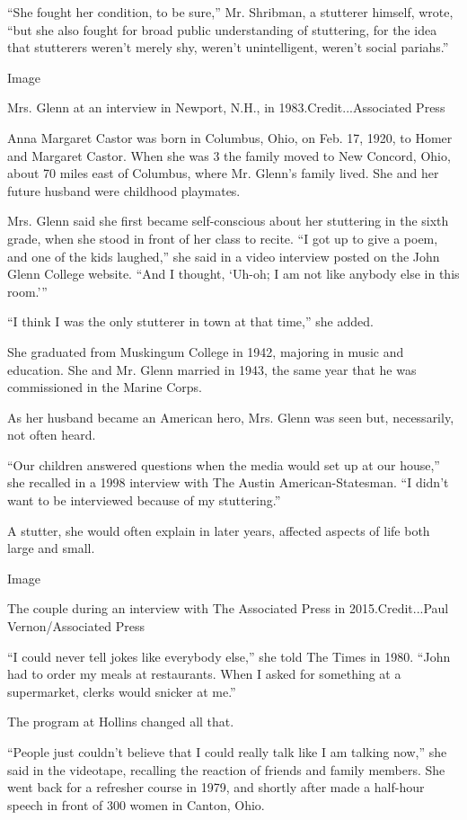 ``She fought her condition, to be sure,'' Mr. Shribman, a stutterer
himself, wrote, ``but she also fought for broad public understanding of
stuttering, for the idea that stutterers weren't merely shy, weren't
unintelligent, weren't social pariahs.''

Image

Mrs. Glenn at an interview in Newport, N.H., in 1983.Credit...Associated
Press

Anna Margaret Castor was born in Columbus, Ohio, on Feb. 17, 1920, to
Homer and Margaret Castor. When she was 3 the family moved to New
Concord, Ohio, about 70 miles east of Columbus, where Mr. Glenn's family
lived. She and her future husband were childhood playmates.

Mrs. Glenn said she first became self-conscious about her stuttering in
the sixth grade, when she stood in front of her class to recite. ``I got
up to give a poem, and one of the kids laughed,'' she said in a video
interview posted on the John Glenn College website. ``And I thought,
`Uh-oh; I am not like anybody else in this room.'''

``I think I was the only stutterer in town at that time,'' she added.

She graduated from Muskingum College in 1942, majoring in music and
education. She and Mr. Glenn married in 1943, the same year that he was
commissioned in the Marine Corps.

As her husband became an American hero, Mrs. Glenn was seen but,
necessarily, not often heard.

``Our children answered questions when the media would set up at our
house,'' she recalled in a 1998 interview with The Austin
American-Statesman. ``I didn't want to be interviewed because of my
stuttering.''

A stutter, she would often explain in later years, affected aspects of
life both large and small.

Image

The couple during an interview with The Associated Press in
2015.Credit...Paul Vernon/Associated Press

``I could never tell jokes like everybody else,'' she told The Times in
1980. ``John had to order my meals at restaurants. When I asked for
something at a supermarket, clerks would snicker at me.''

The program at Hollins changed all that.

``People just couldn't believe that I could really talk like I am
talking now,'' she said in the videotape, recalling the reaction of
friends and family members. She went back for a refresher course in
1979, and shortly after made a half-hour speech in front of 300 women in
Canton, Ohio.

